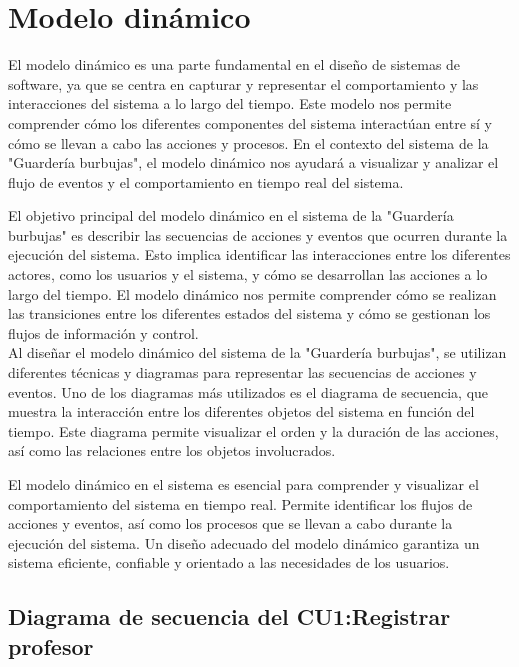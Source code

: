 \chapter{Modelo dinámico}	


El modelo dinámico es una parte fundamental en el diseño de sistemas de software, ya que se centra en capturar y representar el comportamiento y las interacciones del sistema a lo largo del tiempo. Este modelo nos permite comprender cómo los diferentes componentes del sistema interactúan entre sí y cómo se llevan a cabo las acciones y procesos. En el contexto del sistema de la "Guardería burbujas", el modelo dinámico nos ayudará a visualizar y analizar el flujo de eventos y el comportamiento en tiempo real del sistema.

El objetivo principal del modelo dinámico en el sistema de la "Guardería burbujas" es describir las secuencias de acciones y eventos que ocurren durante la ejecución del sistema. Esto implica identificar las interacciones entre los diferentes actores, como los usuarios y el sistema, y cómo se desarrollan las acciones a lo largo del tiempo. El modelo dinámico nos permite comprender cómo se realizan las transiciones entre los diferentes estados del sistema y cómo se gestionan los flujos de información y control.
\\

Al diseñar el modelo dinámico del sistema de la "Guardería burbujas", se utilizan diferentes técnicas y diagramas para representar las secuencias de acciones y eventos. Uno de los diagramas más utilizados es el diagrama de secuencia, que muestra la interacción entre los diferentes objetos del sistema en función del tiempo. Este diagrama permite visualizar el orden y la duración de las acciones, así como las relaciones entre los objetos involucrados.

El modelo dinámico en el sistema es esencial para comprender y visualizar el comportamiento del sistema en tiempo real. Permite identificar los flujos de acciones y eventos, así como los procesos que se llevan a cabo durante la ejecución del sistema. Un diseño adecuado del modelo dinámico garantiza un sistema eficiente, confiable y orientado a las necesidades de los usuarios.

\newpage
\section{Diagrama de secuencia del CU1:Registrar profesor}


